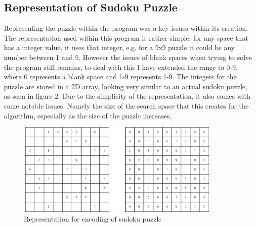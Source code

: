 \documentclass[a4paper,11pt]{article}
\begin{document}
\subsection{Representation of Sudoku Puzzle}
Representing the puzzle within the program was a key issues within its creation. The representation used within this program is rather simple, for any space that has a integer value, it uses that integer, e.g. for a 9x9 puzzle it could be any number between 1 and 9. However the issues of blank spaces when trying to solve the program still remains, to deal with this I have extended the range to 0-9, where 0 represents a blank space and 1-9 represents 1-9. The integers for the puzzle are stored in a 2D array, looking very similar to an actual sudoku puzzle, as seen in figure 2. Due to the simplicity of the representation, it also comes with some notable issues. Namely the size of the search space that this creates for the algorithm, especially as the size of the puzzle increases. 
\begin{figure}[h]
	\caption{Representation for encoding of sudoku puzzle}
	\centering
	\includegraphics[height=4.5cm, width=10cm]{./Diagrams/representationDiagram}
\end{figure}
\end{document}
